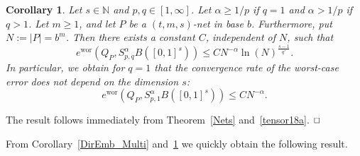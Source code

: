 \documentclass[12pt]{article}
\DeclareMathOperator{\wor}{wor}
\newtheorem{corollary}{Corollary}
\newenvironment{proof}{\begin{trivlist}
    \item[\hskip\labelsep{\it Proof.}]}{$\hfill\Box$\end{trivlist}}
\newcommand{\N}{\mathbb{N}}
\begin{document}

\begin{corollary}\label{Cor:Nets_Besov_Spaces}
Let $s\in \N$ and $p,q\in [1,\infty]$. Let $\alpha \ge 1/p$ if $q=1$ and $\alpha > 1/p$ if $q>1$.
Let $m\ge 1$, and let $P$ be a $(t,m,s)$-net in base $b$. 
Furthermore, put $N:=|P|=b^{m}$.
Then there exists a constant $C$, independent of $N$, such that
\begin{equation}
 \label{nets_besov}
e^{\wor}(Q_P, S^{\alpha}_{p,q}B([0,1]^s))
\le C N^{-\alpha}
\ln(N)^{\frac{s-1}{q'}}.
\end{equation}
In particular, we obtain for $q=1$ that the convergence rate of the worst-case error does not depend on the dimension $s$:
\begin{equation}
 \label{nets_besov_q=1}
e^{\wor}(Q_P, S^{\alpha}_{p,1}B([0,1]^s))
\le C N^{-\alpha}.
\end{equation}
\end{corollary}

\begin{proof}
The result follows immediately from Theorem~\ref{Nets}  and~\ref{tensor18a}.
\end{proof}

From  
Corollary~\ref{DirEmb_Multi} and~\ref{Cor:Nets_Besov_Spaces} we quickly obtain the 
following result. 
\end{document}
